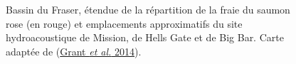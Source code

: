 \documentclass[french,11pt]{book}
\begin{document}
\begin{figure}[htb]

{\centering {} 

}

\caption{Bassin du Fraser, étendue de la répartition de la fraie du saumon rose (en rouge) et emplacements approximatifs du site hydroacoustique de Mission, de Hells Gate et de Big Bar. Carte adaptée de (\protect\hyperlink{ref-grantFraserRiverPink2014}{Grant \emph{et al.} 2014}).}\label{fig:fig-map}
\end{figure}
\end{document}
